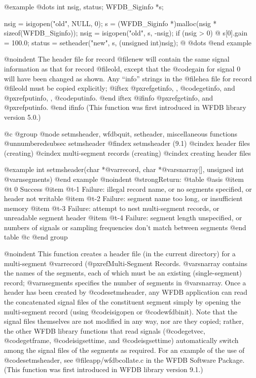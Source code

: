 {{{{{{{{{@example
@dots{}
int nsig, status;
WFDB_Siginfo *s;

nsig = isigopen("old", NULL, 0);
s = (WFDB_Siginfo *)malloc(nsig * sizeof(WFDB_Siginfo));
nsig = isigopen("old", s, -nsig);
if (nsig > 0) @{
    s[0].gain = 100.0;
    status = setheader("new", s, (unsigned int)nsig);
@}
@dots{}
@end example

@noindent
The header file for record @file{new} will contain the same signal
information as that for record @file{old}, except that the @code{gain}
for signal 0 will have been changed as shown.  Any ``info'' strings in
the @file{hea} file for record @file{old} must be copied explicitly;
@iftex
@pxref{getinfo, , @code{getinfo}}, and @pxref{putinfo, , @code{putinfo}}.
@end iftex
@ifinfo
@pxref{getinfo}, and @pxref{putinfo}.
@end ifinfo
(This function was first
introduced in WFDB library version 5.0.)

@c @group
@node     setmsheader, wfdbquit, setheader, miscellaneous functions
@unnumberedsubsec setmsheader
@findex setmsheader (9.1)
@cindex header files (creating)
@cindex multi-segment records (creating)
@cindex creating header files

@example
int setmsheader(char *@var{record}, char *@var{snarray}[], unsigned int @var{nsegments})
@end example
@noindent
@strong{Return:}
@table @asis
@item @t{ 0}
Success
@item @t{-1}
Failure: illegal record name, or no segments specified, or header not writable
@item @t{-2}
Failure: segment name too long, or insufficient memory
@item @t{-3}
Failure: attempt to nest multi-segment records, or unreadable segment
header
@item @t{-4}
Failure: segment length unspecified, or numbers of signals or sampling
frequencies don't match between segments
@end table
@c @end group

@noindent
This function creates a header file (in the current directory) for a
multi-segment @var{record} (@pxref{Multi-Segment Records}.  @var{snarray}
contains the names of the segments, each of which must be an existing
(single-segment) record; @var{nsegments} specifies the number of segments in
@var{snarray}.  Once a header has been created by @code{setmsheader}, any WFDB
application can read the concatenated signal files of the constituent segment
simply by opening the multi-segment record (using @code{isigopen} or
@code{wfdbinit}).  Note that the signal files themselves are not modified in
any way, nor are they copied; rather, the other WFDB library functions that
read signals (@code{getvec}, @code{getframe}, @code{isigsettime}, and
@code{isgsettime}) automatically switch among the signal files of the segments
as required.  For an example of the use of @code{setmsheader}, see
@file{app/wfdbcollate.c} in the WFDB Software Package.  (This function was
first introduced in WFDB library version 9.1.)

}}}}}}}}}

